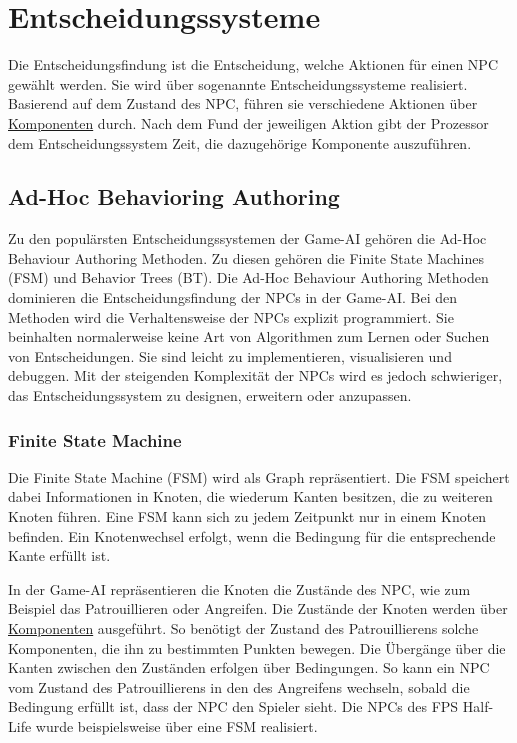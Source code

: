 \chapter{Entscheidungssysteme}
\label{chap:entscheidungssysteme}


Die Entscheidungsfindung ist die Entscheidung, welche Aktionen f\"{u}r einen NPC gew\"{a}hlt werden. Sie wird \"{u}ber sogenannte Entscheidungssysteme realisiert. Basierend auf dem Zustand des NPC, f\"{u}hren sie verschiedene Aktionen \"{u}ber \hyperref[chap:game-objects]{Komponenten} durch. Nach dem Fund der jeweiligen Aktion gibt der Prozessor dem Entscheidungssystem Zeit, die dazugeh\"{o}rige Komponente auszuf\"{u}hren.

\section{Ad-Hoc Behavioring Authoring}
\label{chap:ahba}

Zu den popul\"{a}rsten Entscheidungssystemen der Game-AI geh\"{o}ren die Ad-Hoc Behaviour Authoring Methoden. Zu diesen geh\"{o}ren die Finite State Machines (FSM) und Behavior Trees (BT). Die Ad-Hoc Behaviour Authoring Methoden dominieren die Entscheidungsfindung der NPCs in der Game-AI. Bei den Methoden wird die Verhaltensweise der NPCs explizit programmiert. Sie beinhalten normalerweise keine Art von Algorithmen zum Lernen oder Suchen von Entscheidungen. Sie sind leicht zu implementieren, visualisieren und debuggen. Mit der steigenden Komplexit\"{a}t der NPCs wird es jedoch schwieriger, das Entscheidungssystem zu designen, erweitern oder anzupassen.

\subsection{Finite State Machine}
\label{chap:fsm}

Die Finite State Machine (FSM) wird als Graph repr\"{a}sentiert. Die FSM speichert dabei Informationen in Knoten, die wiederum Kanten besitzen, die zu weiteren Knoten f\"{u}hren. Eine FSM kann sich zu jedem Zeitpunkt nur in einem Knoten befinden. Ein Knotenwechsel erfolgt, wenn die Bedingung f\"{u}r die entsprechende Kante erf\"{u}llt ist. 

In der Game-AI repr\"{a}sentieren die Knoten die Zust\"{a}nde des NPC, wie zum Beispiel das Patrouillieren oder Angreifen. Die Zust\"{a}nde der Knoten werden \"{u}ber \hyperref[chap:game-objects]{Komponenten} ausgef\"{u}hrt. So ben\"{o}tigt der Zustand des Patrouillierens solche Komponenten, die ihn zu bestimmten Punkten bewegen. Die \"{U}berg\"{a}nge \"{u}ber die Kanten zwischen den Zust\"{a}nden erfolgen \"{u}ber Bedingungen. So kann ein NPC vom Zustand des Patrouillierens in den des Angreifens wechseln, sobald die Bedingung erf\"{u}llt ist, dass der NPC den Spieler sieht. Die NPCs des FPS Half-Life wurde beispielsweise \"{u}ber eine FSM realisiert.

